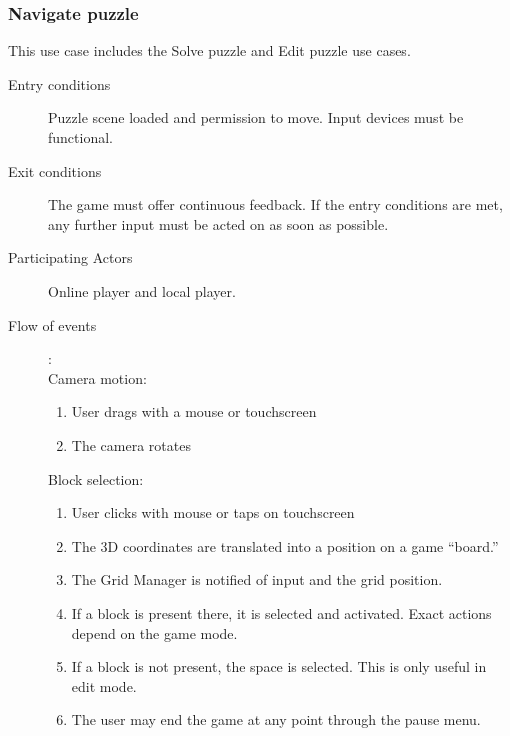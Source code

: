 \documentclass[12pt]{article}
\begin{document}
\begin{mdframed}
    \subsubsection{Navigate puzzle}
    This use case includes the Solve puzzle and Edit puzzle use cases.
    \begin{description}
        \item[Entry conditions] Puzzle scene loaded and permission to move.
            Input devices must be functional.
        \item[Exit conditions] The game must offer continuous feedback.
            If the entry conditions are met, any further input must be
            acted on as soon as possible.
        \item[Participating Actors] Online player and local player.
        \item[Flow of events]:
        	\\
            Camera motion:
            \begin{enumerate}
                \item User drags with a mouse or touchscreen
                \item The camera rotates
            \end{enumerate}

            Block selection:
            \begin{enumerate}
                \item User clicks with mouse or taps on touchscreen
                \item The 3D coordinates are translated into a position on
                    a game ``board.''
                \item The Grid Manager is notified of input and the grid
                    position.
                \item If a block is present there, it is selected and activated.
                    Exact actions depend on the game mode.
                \item If a block is not present, the space is selected. This
                    is only useful in edit mode.
                \item The user may end the game at any point through the pause
                    menu.
            \end{enumerate}

    \end{description}
\end{mdframed}
\end{document}
